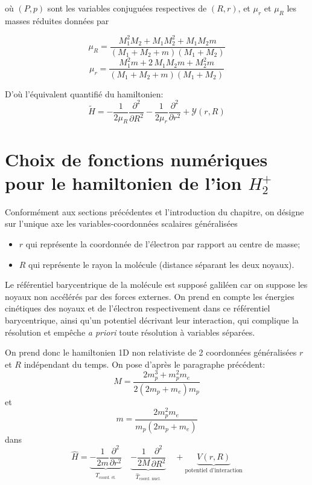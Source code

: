 \documentclass[svgnames,dvipsnames,a4paper,10pt,french]{report}
\begin{document}
où $(P,p)$ sont les variables conjuguées respectives de $(R,r)$, et $\mu_r$ et $\mu_R$ les masses réduites données par

\begin{equation}
    \boxed{\mu_R = \frac{M_{1}^{2} M_{2} + M_{1} M_{2}^{2} + M_{1} M_{2} m}{\left(M_{1} + M_{2} + m\right)\left(M_{1} + M_{2}\right)}}
\end{equation}
\begin{equation}
    \boxed{\mu_r = \frac{M_{1}^{2} m + 2 \, M_{1} M_{2} m + M_{2}^{2} m}{\left(M_{1} + M_{2} + m\right)\left(M_{1} + M_{2}\right)}}
\end{equation}

D'où l'équivalent quantifié du hamiltonien:
\begin{equation}
    \boxed{\tilde{H} = - \frac{1}{2\mu_R} \frac{\partial^2}{\partial R^2} - \frac{1}{2\mu_r} \frac{\partial^2}{\partial r^2} + \mathcal{Y}(r,R)}
\end{equation}




\section{Choix de fonctions numériques pour le hamiltonien de  l'ion $H_2^+$}
\label{sec:choix_fonctions}


Conformément aux sections précédentes et l'introduction du chapitre,  on désigne sur l'unique axe les variables-coordonnées scalaires généralisées
\begin{itemize}
    \item $r$ qui représente la coordonnée de l'électron par rapport au centre de masse;
    \item $R$ qui représente le rayon la molécule (distance séparant les deux noyaux).
\end{itemize}
Le référentiel barycentrique de la molécule est supposé galiléen car on suppose les noyaux non accélérés par des forces externes. On prend en compte  les énergies cinétiques des noyaux et de l'électron respectivement dans ce référentiel barycentrique, ainsi qu'un potentiel décrivant leur interaction, qui complique la résolution et empêche \emph{a priori} toute résolution à variables séparées. 

On prend donc le hamiltonien 1D non relativiste de 2 coordonnées généralisées $r$ et $R$ indépendant du temps. On pose  d'après le paragraphe précédent:
\begin{equation}
    M = \frac{2 m_p^3 + m_p^2m_e}{2(2m_p+m_e)m_p}
\end{equation}
et
\begin{equation}
    m = \frac{2 m_p^2m_e}{m_p(2m_p+m_e)}
\end{equation}
dans
\begin{equation}
\label{hamiltonien_original}
    \boxed{\hat{H} = \underbrace{-\frac{1}{2m} \frac{\partial^2}{\partial r^2}}_{\hat{T}_{\text{coord. él.}}} \quad \underbrace{-\frac{1}{2M} \frac{\partial^2}{\partial R^2}}_{\hat{T}_{\text{coord. nucl.}}} \quad + \underbrace{V(r,R)}_{\text{potentiel d'interaction}}}
\end{equation}
\end{document}
